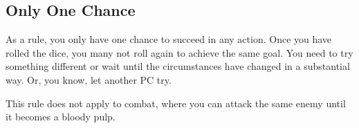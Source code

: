     \thispagestyle{empty} %

\subsection*{Only One Chance} \label{ssec::onlyonechance}
    As a rule, you only have one chance to succeed in any action.
    Once you have rolled the dice, you many not roll again to achieve the same goal.
    You need to try something different or wait until the circumstances have changed in a substantial way.
    Or, you know, let another PC try.

    This rule does not apply to combat, where you can attack the same enemy until it becomes a bloody pulp.


